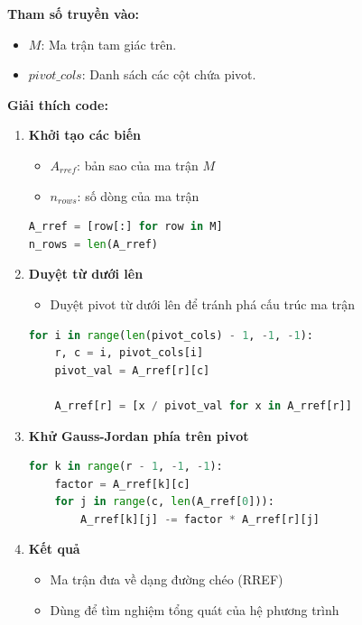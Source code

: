 \documentclass[a4paper,12pt]{report}
\begin{document}
\smallskip

\noindent\textbf{Tham số truyền vào:}
\begin{itemize}
    \item $M$: Ma trận tam giác trên.
    \item $pivot\_cols$: Danh sách các cột chứa pivot.
\end{itemize}

\smallskip

\noindent\textbf{Giải thích code:}

\begin{enumerate}

\item \textbf{Khởi tạo các biến}

\begin{itemize}
    \item $A_{rref}$: bản sao của ma trận $M$
    \item $n_{rows}$: số dòng của ma trận
\end{itemize}

\begin{lstlisting}[language=Python, caption={Khởi tạo biến}]
A_rref = [row[:] for row in M]
n_rows = len(A_rref)
\end{lstlisting}

\item \textbf{Duyệt từ dưới lên}

\begin{itemize}
    \item Duyệt pivot từ dưới lên để tránh phá cấu trúc ma trận
\end{itemize}

\begin{lstlisting}[language=Python, caption={Duyệt pivot}]
for i in range(len(pivot_cols) - 1, -1, -1):
    r, c = i, pivot_cols[i]
    pivot_val = A_rref[r][c]

    A_rref[r] = [x / pivot_val for x in A_rref[r]]
\end{lstlisting}

\item \textbf{Khử Gauss-Jordan phía trên pivot}

\begin{lstlisting}[language=Python, caption={Khử phía trên pivot}]
for k in range(r - 1, -1, -1):
    factor = A_rref[k][c]
    for j in range(c, len(A_rref[0])):
        A_rref[k][j] -= factor * A_rref[r][j]
\end{lstlisting}

\item \textbf{Kết quả}

\begin{itemize}
    \item Ma trận đưa về dạng đường chéo (RREF)
    \item Dùng để tìm nghiệm tổng quát của hệ phương trình
\end{itemize}
\end{enumerate}
\end{document}
